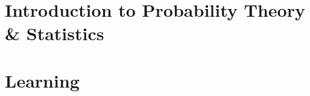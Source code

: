 \documentclass[../../deep-dive]{subfiles}
\begin{document}
\chapter{Introduction to Probability Theory \& Statistics}



\chapter{Learning}


\end{document}
